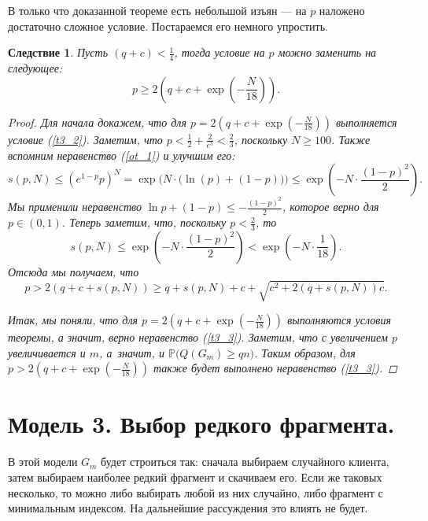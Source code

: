 \documentclass{matmex-diploma-custom}
\newcommand{\PRob}{\mathbb P}
\newcommand{\leqs}{\leqslant}
\newcommand{\geqs}{\geqslant}
\newtheorem{cons}{Следствие}
\theoremstyle{named}
\begin{document}
В только что доказанной теореме есть небольшой изъян --- на $p$ наложено достаточно сложное условие. 
Постараемся его немного упростить.
\begin{cons}
Пусть $(q+c) < \frac{1}{4}$, тогда условие на $p$ можно заменить на следующее:
\begin{equation}
p \geqs 2\left(q + c + \exp\left(-\frac{N}{18}\right) \right).
\end{equation}

\begin{proof}
Для начала докажем, что для $p = 2\left(q + c + \exp\left(-\frac{N}{18}\right) \right)$ выполняется условие (\ref{t3_2}).
Заметим, что $p < \frac{1}{2} + \frac{2}{e^5} < \frac{2}{3}$, поскольку $N \geqs 100$.
Также вспомним неравенство (\ref{ot_1}) и улучшим его:
\begin{equation}
s(p, N) \leqs (e^{1-p} p)^N 
	=
\exp\Big(N\cdot \big( \ln(p) + (1-p) \big)\Big)
	\leqs
\exp\left( - N \cdot \frac{(1-p)^2}{2}\right).
\end{equation}
Мы применили неравенство $\ln p + (1-p) \leqs - \frac{(1-p)^2}{2}$, которое верно для $p\in(0,1)$.
Теперь заметим, что, поскольку $p < \frac{2}{3}$, то 
\begin{equation}
s(p, N) \leqs \exp\left( - N \cdot \frac{(1-p)^2}{2}\right) < \exp\left( - N\cdot \frac{1}{18}\right).
\end{equation}
Отсюда мы получаем, что 
\begin{equation}
p > 2(q+c+s(p,N)) \geqs q + s(p, N) + c + \sqrt{c^2+2(q+s(p, N))c}.
\end{equation}

Итак, мы поняли, что для $p = 2\left(q + c + \exp\left(-\frac{N}{18}\right) \right)$ выполняются условия теоремы, 
а значит, верно неравенство (\ref{t3_3}). 
Заметим, что с увеличением $p$ увеличивается и $m$, а~значит, и $\PRob\big(Q(G_m) \geqs qn\big)$.
Таким образом, для $p > 2\left(q + c + \exp\left(-\frac{N}{18}\right) \right)$ также будет выполнено неравенство (\ref{t3_3}).
\end{proof}
\end{cons}


\newpage
\section*{Модель 3. Выбор редкого фрагмента.}

В этой модели $G_m$ будет строиться так: сначала выбираем случайного клиента, затем выбираем наиболее редкий фрагмент и скачиваем его.
Если же таковых несколько, то можно либо выбирать любой из них случайно, либо фрагмент с минимальным индексом. 
На дальнейшие рассуждения это влиять не будет.
\end{document}
